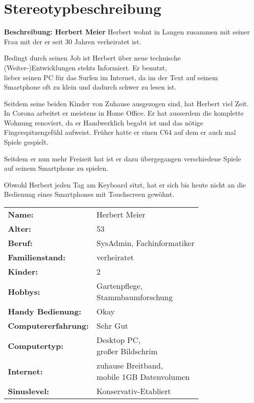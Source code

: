 \documentclass[12pt, a4paper]{article}
\begin{document}
\section{Stereotypbeschreibung}
\begin{flushleft}
\textbf{Beschreibung: Herbert Meier}\newline
Herbert wohnt in Langen zusammen mit seiner Frau mit der er seit 30 Jahren verheiratet ist.\newline

Bedingt durch seinen Job ist Herbert über neue technische (Weiter-)Entwicklungen stehts Informiert. Er benutzt,\\ lieber seinen PC für das Surfen im Internet, da im der Text auf seinem Smartphone oft zu klein und dadurch schwer zu lesen ist.\newline

Seitdem seine beiden Kinder von Zuhause ausgezogen sind, hat Herbert viel Zeit. In Corona arbeitet er meistens in Home Office. Er hat ausserdem die komplette Wohnung renoviert, da er Handwerklich begabt ist und das nötige Fingerspitzengefühl aufweist. Früher hatte er einen C64 auf dem er auch mal Spiele gespielt.\newline

Seitdem er nun mehr Freizeit hat ist er dazu übergegangen verschiedene Spiele auf seinem Smartphone zu spielen.\newline 

Obwohl Herbert jeden Tag am Keyboard sitzt, hat er sich bis heute nicht an die Bedienung eines Smartphones mit Touchscreen gewöhnt.

\par\bigskip

\begin{table}[H]
\begin{center}
\begin{tabular}[h]{|l l|}
\hline
\textbf{Name:} & Herbert Meier\\
\textbf{Alter:} & 53\\
\textbf{Beruf:} & SysAdmin, Fachinformatiker\\
\textbf{Familienstand:} & verheiratet\\
\textbf{Kinder:} & 2\\
\textbf{Hobbys:} & \makecell[l]{ Gartenpflege,\\ Stammbaumforschung\\}\\
\textbf{Handy Bedienung:} & Okay\\
\textbf{Computererfahrung:} & Sehr Gut\\
\textbf{Computertyp:} & \makecell[l]{Desktop PC,\\ großer Bildschrim}\\
\textbf{Internet:} & \makecell[l]{zuhause Breitband,\\ mobile 1GB Datenvolumen\\}\\
\textbf{Sinuslevel:} & Konservativ-Etabliert\\
\hline
\end{tabular}
\end{center}
\end{table}


\end{flushleft}
\end{document}
